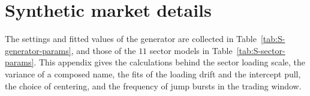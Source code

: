 
\section{Synthetic market details}\label{app:synthetic}

The settings and fitted values of the generator are collected in Table~\ref{tab:S-generator-params}, and those of
the $11$ sector models in Table~\ref{tab:S-sector-params}. This appendix gives the calculations behind the sector
loading scale, the variance of a composed name, the fits of the loading drift and the intercept pull, the choice of
centering, and the frequency of jump bursts in the trading window.

